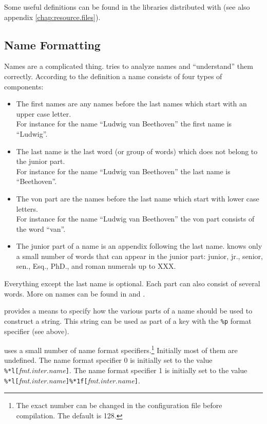 \documentclass[11pt,a4paper]{scrbook}
\begin{document}
\begin{Resources}
\end{Resources}

Some useful definitions can be found in the libraries distributed with
\BibTool{} (see also appendix \ref{chap:resource.files}). 


\subsection{Name Formatting}\label{sec:names}

Names are a complicated thing. \BibTool{} tries to analyze names and
``understand'' them correctly. According to the \BibTeX{} definition a
name consists of four types of components:
\begin{itemize}
\item The first names are any names before the last names which start
  with an upper case letter.\\
  For instance for the name ``Ludwig van Beethoven'' the first name is
  ``Ludwig''.
\item The last name is the last word (or group of words) which does
  not belong to the junior part.\\
  For instance for the name ``Ludwig van Beethoven'' the last name is
  ``Beethoven''.
\item The von part are the names before the last name which start with
  lower case letters.\\
  For instance for the name ``Ludwig van Beethoven'' the von part consists of
  the word ``van''.
\item The junior part of a name is an appendix following the last
  name. \BibTool{} knows only a small number of words that can appear
  in the junior part: junior, jr., senior, sen., Esq., PhD., and roman
  numerals up to XXX.
\end{itemize}

Everything except the last name is optional. Each part can also consist of
several words. More on names can be found in \cite{lamport:latex} and
\cite{patashnik:designing}.

\BibTool{} provides a means to specify how the various parts of a name
should be used to construct a string. This string can be used as part
of a key with the \texttt{\%p} format specifier (see above).

\BibTool{} uses a small number of name format specifiers.\footnote{The exact
  number can be changed in the configuration file before compilation. The
  default is 128.} Initially most of them are undefined. The name format
specifier 0 is initially set to the value
\verb|%*l[|\emph{fmt.inter.name}\/\verb|]|. The name format specifier 1 is
initially set to the value 
\verb|%*l[|\emph{fmt.inter.name}\/\verb|]%*1f[|\emph{fmt.inter.name}\/\verb|]|. 
\end{document}
